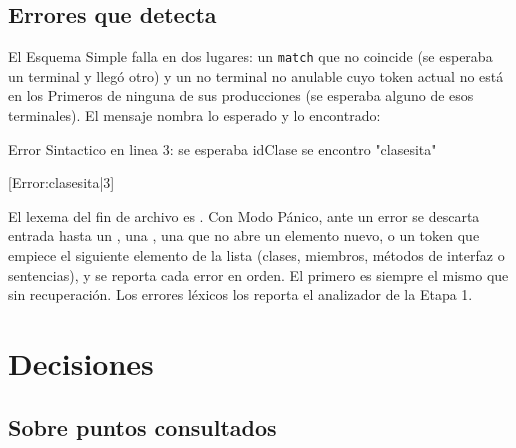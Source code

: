 \documentclass[12pt,a4paper]{article}
\begin{document}
\subsection{Errores que detecta}
\label{sec:errores}

El Esquema Simple falla en dos lugares: un \texttt{match} que no coincide (se esperaba un terminal y
llegó otro) y un no terminal no anulable cuyo token actual no está en los Primeros de ninguna de sus
producciones (se esperaba alguno de esos terminales). El mensaje nombra lo esperado y lo encontrado:

\begin{consola}
Error Sintactico en linea 3: se esperaba idClase se encontro "clasesita"

[Error:clasesita|3]
\end{consola}

El lexema del fin de archivo es \tl{\$}. Con Modo Pánico, ante un error se descarta entrada hasta un
\tl{;}, una \tl{\}}, una \tl{\{} que no abre un elemento nuevo, o un token que empiece el siguiente
elemento de la lista (clases, miembros, métodos de interfaz o sentencias), y se reporta cada error
en orden. El primero es siempre el mismo que sin recuperación. Los errores léxicos los reporta el
analizador de la Etapa 1.

\section{Decisiones}
\label{sec:decisiones}

\subsection{Sobre puntos consultados}
\end{document}
